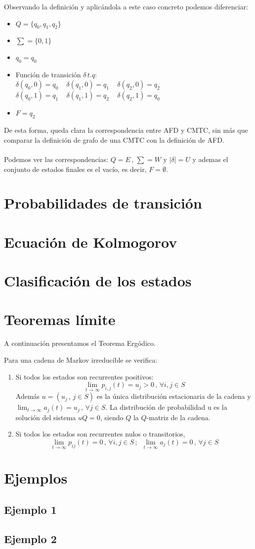 \documentclass[12pt,a4paper]{article}
\begin{document}
Observando la definición y aplicándola a este caso concreto podemos diferenciar:
\begin{itemize}
\item $Q=\{q_0,q_1,q_2 \}$
\item $\sum = \{0,1\}$
\item $q_0=q_0$
\item Función de transición $\delta \, t.q$:
\\
$\delta(q_0,0)=q_0 \,\,\,\,\,\,\, \delta(q_1,0)=q_1\,\,\,\,\,\,\, \delta(q_2,0)=q_2$
\\
$\delta(q_0,1)=q_1 \,\,\,\,\,\,\,  \delta(q_1,1)=q_2 \,\,\,\,\,\,\,\delta(q_2,1)=q_0$
\item $F={q_2}$
\end{itemize}
De esta forma, queda clara la correspondencia entre AFD y CMTC, sin más que comparar la definición de grafo de una CMTC con la definición de AFD.
\\\\
Podemos ver las correspondencias: $Q=E\, ,\, \sum=W$ y $| \delta |=U$ y ademas el conjunto de estados finales es el vacío, es decir, $F={\emptyset}$. 

\section{Probabilidades de transición}
\section{Ecuación de Kolmogorov}
\section{Clasificación de los estados}
\section{Teoremas límite}
A continuación presentamos el Teorema Ergódico.
\begin{theorem}
Para una cadena de Markov irreducible se verifica:
\begin{enumerate}
\item Si todos los estados son recurrentes positivos:
$$\lim_{t\rightarrow\infty}p_{i,j}(t)=u_j>0 \, , \, \forall i,j\in S$$
Además $u=(u_j \, , \, j\in S)$ es la única distribución estacionaria de la cadena y $\displaystyle\lim_{t\rightarrow\infty}a_j (t)=u_j \, , \, \forall j\in S$. La distribución de probabilidad u es la solución del sistema $uQ=0$, siendo $Q$ la $Q$-matriz de la cadena.
\item Si todos los estados son recurrentes nulos o transitorios,
$$\lim_{t\rightarrow\infty}p_{ij}(t)=0\, , \, \forall i,j \in S\, ;\,\,\, \lim_{t\rightarrow\infty}a_j (t)=0\, , \, \forall j\in S$$
\end{enumerate}
\end{theorem}
\section{Ejemplos}
\subsection{Ejemplo 1}
\subsection{Ejemplo 2}
\end{document}
